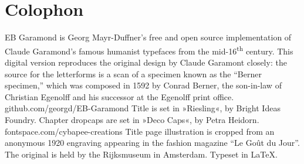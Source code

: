\documentclass[
paper=5.5in:8.5in,
BCOR=7mm,
twoside,
DIV=calc,
12pt,
usegeometry,
chapterprefix,
headings=big]{scrbook} %
\begin{document}
\chapter*{Colophon}
\begin{center}
EB Garamond is Georg Mayr-Duffner's free and open source implementation of Claude Garamond’s famous humanist typefaces from the mid-16\textsuperscript{th} century. This digital version reproduces the original design by Claude Garamont closely: the source for the letterforms is a scan of a specimen known as the \enquote{Berner specimen,} which was composed in 1592 by Conrad Berner, the son-in-law of Christian Egenolff and his successor at the Egenolff print office.  \\github.com/georgd/EB-Garamond
\vfill
Title is set in »Riesling«, by Bright Ideas Foundry.
\vfill
Chapter dropcaps are set in »Deco Caps«, by Petra Heidorn.\\fontspace.com/cybapee-creations
\vfill
Title page illustration is cropped from an anonymous 1920 engraving appearing in the fashion magazine \foreignquote{french}{Le Goût du Jour}. The original is held by the Rijksmuseum in Amsterdam.
\vfill
Typeset in \LaTeX{}.
\end{center}
\thispagestyle{empty}
\end{document}
